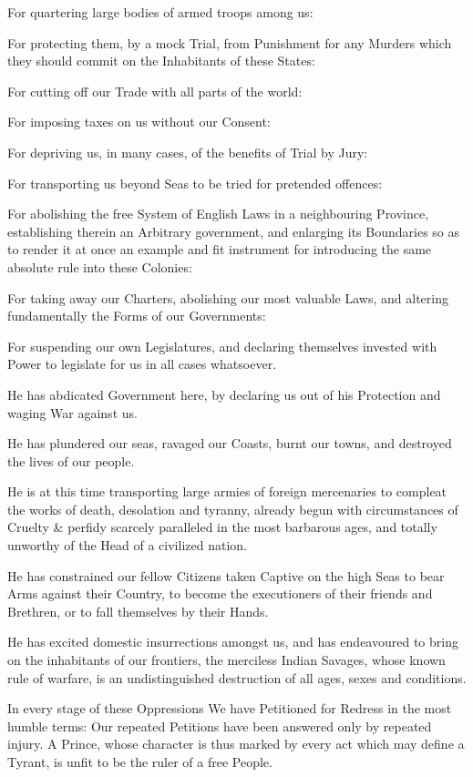 \documentclass{article}
\begin{document}
For quartering large bodies of armed troops among us:

For protecting them, by a mock Trial, from Punishment for any Murders
which they should commit on the Inhabitants of these States:

For cutting off our Trade with all parts of the world:

For imposing taxes on us without our Consent:

For depriving us, in many cases, of the benefits of Trial by Jury:

For transporting us beyond Seas to be tried for pretended offences:

For abolishing the free System of English Laws in a neighbouring
Province, establishing therein an Arbitrary government,
and enlarging its Boundaries so as to render it at once
an example and fit instrument for introducing the same
absolute rule into these Colonies:

For taking away our Charters, abolishing our most valuable Laws,
and altering fundamentally the Forms of our Governments:

For suspending our own Legislatures, and declaring themselves
invested with Power to legislate for us in all cases whatsoever.

He has abdicated Government here, by declaring us out of his Protection
and waging War against us.

He has plundered our seas, ravaged our Coasts, burnt our towns,
and destroyed the lives of our people.

He is at this time transporting large armies of foreign mercenaries
to compleat the works of death, desolation and tyranny, already begun
with circumstances of Cruelty \& perfidy scarcely paralleled in the
most barbarous ages, and totally unworthy of the Head of a civilized nation.

He has constrained our fellow Citizens taken Captive on the high Seas
to bear Arms against their Country, to become the executioners of
their friends and Brethren, or to fall themselves by their Hands.

He has excited domestic insurrections amongst us, and has
endeavoured to bring on the inhabitants of our frontiers,
the merciless Indian Savages, whose known rule of warfare,
is an undistinguished destruction of all ages, sexes and conditions.

In every stage of these Oppressions We have Petitioned for Redress
in the most humble terms:  Our repeated Petitions have been answered
only by repeated injury.  A Prince, whose character is thus marked
by every act which may define a Tyrant, is unfit to be the ruler
of a free People.
\end{document}
